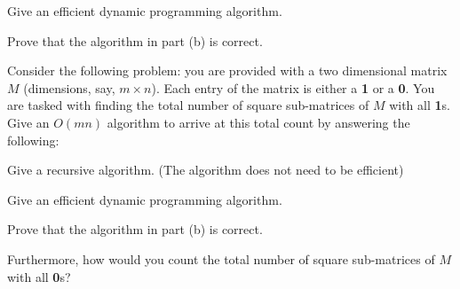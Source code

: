 \documentclass[solutionbox,answers]{exam}
\begin{document}
\begin{questions}
\begin{parts}
\begin{solutionbox}{}
\end{solutionbox}

\item Give an efficient dynamic programming algorithm.
\begin{solutionbox}{} \vspace{1em} 

\end{solutionbox}

\item Prove that the algorithm in part (b) is correct.
\begin{solutionbox}{} \vspace{1em} 

\end{solutionbox}
\end{parts}

\newpage


\question 
Consider the following problem: you are provided with a two dimensional matrix $M$ (dimensions, say, $m \times n$). 
Each entry of the matrix is either a \textbf{1} or a \textbf{0}. 
You are tasked with finding the total number of square sub-matrices of $M$ with all \textbf{1}s. 
Give an $O(mn)$ algorithm to arrive at this total count by answering the following:

\begin{parts}
  \item Give a recursive algorithm. (The algorithm does not need to be efficient)
  \begin{solutionbox}{} \vspace{1em} 
  
  \end{solutionbox}
  
  \item Give an efficient dynamic programming algorithm.
  \begin{solutionbox}{} \vspace{1em} 
  
  \end{solutionbox}
  
  \item Prove that the algorithm in part (b) is correct.
  \begin{solutionbox}{} \vspace{1em} 
  
  \end{solutionbox}

  \item Furthermore, how would you count the total number of square sub-matrices of $M$ with all \textbf{0}s?
  \begin{solutionbox}{} \vspace{1em} 
  

\end{solutionbox}
\end{parts}
\end{questions}
\end{document}
